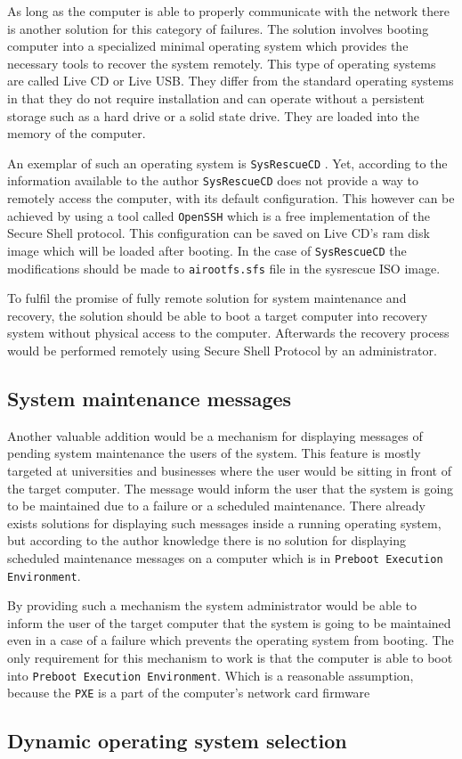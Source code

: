 \documentclass[../main.tex]{subfiles}
\begin{document}
As long as the computer is able to properly communicate with the network there is another solution for this category
of failures. The solution involves booting computer into a specialized minimal operating system which provides
the necessary tools to recover the system remotely. This type of operating systems are called Live CD \cite{livecdlist} or Live USB.
They differ from the standard operating systems in that they do not require installation and can operate without
a persistent storage such as a hard drive or a solid state drive. They are loaded into the memory of the computer.

An exemplar of such an operating system is \texttt{SysRescueCD} \cite{sysrescuecd}.
Yet, according to the information available to the author \texttt{SysRescueCD} does not provide a way to remotely access the computer,
with its default configuration. This however can be achieved by using a tool called \texttt{OpenSSH} \cite{openssh} which is a free implementation of the Secure Shell protocol.
This configuration can be saved on Live CD's ram disk image which will be loaded after booting. In the case of
\texttt{SysRescueCD} the modifications should be made to \texttt{airootfs.sfs} file in the sysrescue ISO image.

To fulfil the promise of fully remote solution for system maintenance and recovery, the solution should be able to
boot a target computer into recovery system without physical access to the computer. Afterwards the recovery process
would be performed remotely using Secure Shell Protocol by an administrator.

\subsection{System maintenance messages}
Another valuable addition would be a mechanism for displaying messages of pending system maintenance the users of the system.
This feature is mostly targeted at universities and businesses where the user would be sitting in front of the target computer.
The message would inform the user that the system is going to be maintained due to a failure or a scheduled maintenance.
There already exists solutions for displaying such messages inside a running operating system, but according
to the author knowledge there is no solution for displaying scheduled maintenance messages on a computer which is in \texttt{Preboot Execution Environment}\cite{pxespec}.

By providing such a mechanism the system administrator would be able to inform the user of the target computer that
the system is going to be maintained even in a case of a failure which prevents the operating system from booting.
The only requirement for this mechanism to work is that the computer is able to boot into \texttt{Preboot Execution Environment}.
Which is a reasonable assumption, because the \texttt{PXE} is a part of the computer's network card firmware

\subsection{Dynamic operating system selection}
\end{document}
